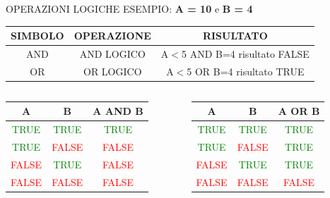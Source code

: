 \documentclass[aspectratio=1610, handout]{beamer}
\begin{document}
\begin{frame}{OPERAZIONI LOGICHE}
    \centering
    ESEMPIO: \textbf{A = 10} e \textbf{B = 4} \\
    \bigskip
    \begin{tabular}{c|c|c}
        \pause
        \textbf{SIMBOLO} & \textbf{OPERAZIONE} & \textbf{RISULTATO} \\
        \hline
        \hline
        \pause
        AND & AND LOGICO & A$<$5 AND B=4 risultato FALSE \\
        \hline
        \pause
        OR & OR LOGICO & A$<$5 OR B=4 risultato TRUE\\
        \hline
    \end{tabular}
    \bigskip
    \begin{columns}
            \begin{tabular}{c|c|c}
                \pause
                \textbf{A} & \textbf{B} & \textbf{A AND B} \\
                \hline
                \hline
                \pause
                \textcolor{green}{TRUE} & \textcolor{green}{TRUE} & \textcolor{green}{TRUE} \\
                \hline
                \pause
                \textcolor{green}{TRUE} & \textcolor{red}{FALSE} & \textcolor{red}{FALSE} \\
                \hline
                \pause
                \textcolor{red}{FALSE} & \textcolor{green}{TRUE} & \textcolor{red}{FALSE} \\
                \hline
                \pause
                \textcolor{red}{FALSE} & \textcolor{red}{FALSE} & \textcolor{red}{FALSE} \\                
            \end{tabular}
            \begin{tabular}{c|c|c}
                \pause
                \textbf{A} & \textbf{B} & \textbf{A OR B} \\
                \hline
                \hline
                \pause
                \textcolor{green}{TRUE} & \textcolor{green}{TRUE} & \textcolor{green}{TRUE} \\
                \hline
                \pause
                \textcolor{green}{TRUE} & \textcolor{red}{FALSE} & \textcolor{green}{TRUE} \\
                \hline
                \pause
                \textcolor{red}{FALSE} & \textcolor{green}{TRUE} & \textcolor{green}{TRUE} \\
                \hline
                \pause
                \textcolor{red}{FALSE} & \textcolor{red}{FALSE} & \textcolor{red}{FALSE} \\                
            \end{tabular}
    \end{columns}
\end{frame}
\end{document}
